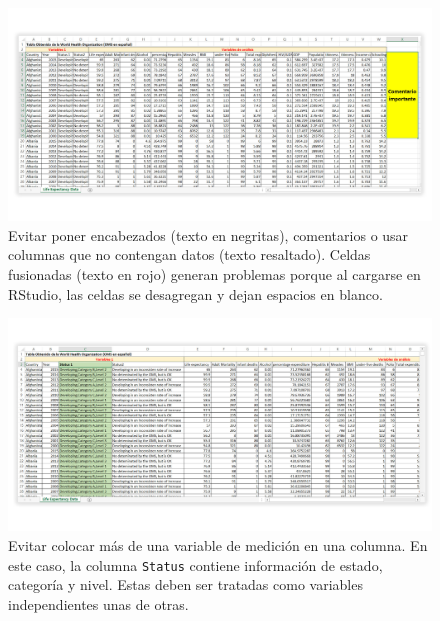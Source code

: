 \documentclass[
]{article}
\theoremstyle{definition}
\theoremstyle{definition}
\theoremstyle{definition}
\theoremstyle{definition}
\theoremstyle{remark}
\begin{document}
\begin{figure}

{\centering \includegraphics[width=1\linewidth]{figs/screenshots/excel1} 

}

\caption{Evitar poner encabezados (texto en negritas), comentarios o usar columnas que no contengan datos (texto resaltado). Celdas fusionadas (texto en rojo) generan problemas porque al cargarse en RStudio, las celdas se desagregan y dejan espacios en blanco.}\label{fig:figura52}
\end{figure}



\begin{figure}

{\centering \includegraphics[width=1\linewidth]{figs/screenshots/excel2} 

}

\caption{Evitar colocar más de una variable de medición en una columna. En este caso, la columna \texttt{Status} contiene información de estado, categoría y nivel. Estas deben ser tratadas como variables independientes unas de otras.}\label{fig:figura53}
\end{figure}
\end{document}
